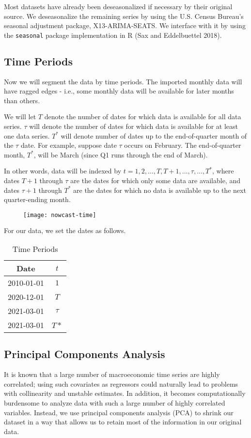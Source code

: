 \documentclass[11pt, letterpaper]{article}\usepackage[]{graphicx}\usepackage[]{color}
\begin{document}
Most datasets have already been deseasonalized if necessary by their original source. We deseasonalize the remaining series by using the U.S. Census Bureau's seasonal adjustment package, X13-ARIMA-SEATS. We interface with it by using the \texttt{seasonal} package implementation in R (Sax and Eddelbuettel 2018).

\subsection{Time Periods}
Now we will segment the data by time periods. The imported monthly data will have ragged edges - i.e., some monthly data will be available for later months than others.

We will let $T$ denote the number of dates for which data is available for all data series. $\tau$ will denote the number of dates for which data is available for at least one data series. $T^*$ will denote number of dates up to the end-of-quarter month of the $\tau$ date. For example, suppose date $\tau$ occurs on February. The end-of-quarter month, $T^*$, will be March (since Q1 runs through the end of March). 

In other words, data will be indexed by $t = 1, 2, \dots, T, T+1, \dots, \tau, \dots, T^*$, where dates $T + 1$ through $\tau$ are the dates for which only some data are available, and dates $\tau + 1$ through $T^*$ are the dates for which no data is available up to the next quarter-ending month.
\begin{figure}[H]
\texttt{[image: nowcast-time]}
\centering
\end{figure}
For our data, we set the dates as follows.
\begin{table}[H]
\centering
\begingroup\footnotesize
\begin{tabular}{cc}
  \hline
Date & $t$ \\ 
  \hline
2010-01-01 & $1$ \\ 
  2020-12-01 & $T$ \\ 
  2021-03-01 & $\tau$ \\ 
  2021-03-01 & $T*$ \\ 
   \hline
\end{tabular}
\endgroup
\caption{Time Periods} 
\end{table}


\subsection{Principal Components Analysis}
It is known that a large number of macroeconomic time series are highly correlated; using such covariates as regressors could naturally lead to problems with collinearity and unstable estimates. In addition, it becomes computationally burdensome to analyze data with such a large number of highly correlated variables. Instead, we use principal components analysis (PCA) to shrink our dataset in a way that allows us to retain most of the information in our original data.
\end{document}
